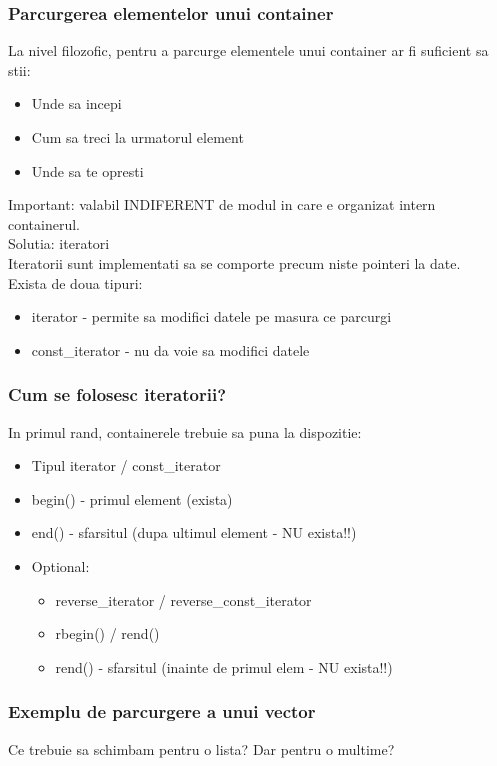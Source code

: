\documentclass{beamer}
\begin{document}
  \begin{frame}
  \frametitle{Parcurgerea elementelor unui container}
  La nivel filozofic, pentru a parcurge elementele unui container ar fi suficient sa stii:
  \begin{itemize}
  \pause \item Unde sa incepi
  \pause \item Cum sa treci la urmatorul element
  \pause \item Unde sa te opresti
  \end{itemize}
  \pause
  Important: valabil INDIFERENT de modul in care e organizat intern containerul.
  \pause
  \\Solutia: iteratori 
  \\Iteratorii sunt implementati sa se comporte precum niste pointeri la date.
  \\ \pause Exista de doua tipuri:
  \begin{itemize}
  \pause \item iterator - permite sa modifici datele pe masura ce parcurgi
  \pause \item const\_iterator - nu da voie sa modifici datele
  \end{itemize}
  \end{frame}

  \begin{frame}
  \frametitle{Cum se folosesc iteratorii?}
  In primul rand, containerele trebuie sa puna la dispozitie:
  \begin{itemize}
  \pause \item Tipul iterator / const\_iterator
  \pause \item begin() - primul element (exista)
  \pause \item end() - sfarsitul (dupa ultimul element - NU exista!!)
  \pause \item Optional:
	\begin{itemize}
	\item reverse\_iterator / reverse\_const\_iterator
        \item rbegin() / rend()
        \item rend() - sfarsitul (inainte de primul elem - NU exista!!)
        \end{itemize}
  \end{itemize}
  \end{frame}

  \begin{frame}
  \frametitle{Exemplu de parcurgere a unui vector}
  
  \pause Ce trebuie sa schimbam pentru o lista? \pause Dar pentru o multime?
  \end{frame}
\end{document}
